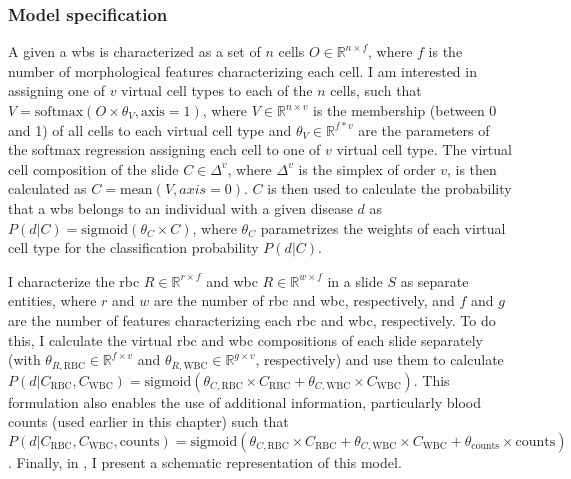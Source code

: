 \subsubsection{Model specification}

A given a \ac{wbs} is characterized as a set of $n$ cells $O \in \mathbb{R}^{n \times f}$, where $f$ is the number of morphological features characterizing each cell. I am interested in assigning one of $v$ virtual cell types to each of the $n$ cells, such that $V = \mathrm{softmax}(O \times \theta_{V},\mathrm{axis}=1)$, where $V \in \mathbb{R}^{n \times v}$ is the membership (between 0 and 1) of all cells to each virtual cell type and $\theta_{V} \in \mathbb{R}^{f * v}$ are the parameters of the softmax regression assigning each cell to one of $v$ virtual cell type. The virtual cell composition of the slide $C \in \Delta^{v}$, where $\Delta^{v}$ is the simplex of order $v$, is then calculated as $C=\mathrm{mean}(V,axis=0)$. $C$ is then used to calculate the probability that a \ac{wbs} belongs to an individual with a given disease $d$ as $P(d|C) = \mathrm{sigmoid}(\theta_{C} \times C)$, where $\theta_C$ parametrizes the weights of each virtual cell type for the classification probability $P(d|C)$.

I characterize the \ac{rbc} $R \in \mathbb{R}^{r \times f}$ and \ac{wbc} $R \in \mathbb{R}^{w \times f}$ in a slide $S$ as separate entities, where $r$ and $w$ are the number of \ac{rbc} and \ac{wbc}, respectively, and $f$ and $g$ are the number of features characterizing each \ac{rbc} and \ac{wbc}, respectively. To do this, I calculate the virtual \ac{rbc} and \ac{wbc} compositions of each slide separately (with $\theta_{R,\mathrm{RBC}} \in \mathbb{R}^{f \times v}$ and $\theta_{R,\mathrm{WBC}} \in \mathbb{R}^{g \times v}$, respectively) and use them to calculate $P(d|C_{\mathrm{RBC}},C_{\mathrm{WBC}}) = \mathrm{sigmoid}(\theta_{C,\mathrm{RBC}} \times C_{\mathrm{RBC}} + \theta_{C,\mathrm{WBC}} \times C_{\mathrm{WBC}})$. This formulation also enables the use of additional information, particularly blood counts (used earlier in this chapter) such that $P(d|C_{\mathrm{RBC}},C_{\mathrm{WBC}},\mathrm{counts}) = \mathrm{sigmoid}(\theta_{C,\mathrm{RBC}} \times C_{\mathrm{RBC}} + \theta_{C,\mathrm{WBC}} \times C_{\mathrm{WBC}} + \theta_{\mathrm{counts}} \times \mathrm{counts})$. Finally, in , I present a schematic representation of this model.

\begin{figure}[!ht]
    \label{fig:mile-vice-schematic}
\end{figure}

